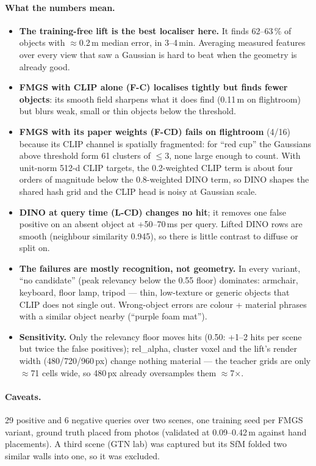 \documentclass[11pt,a4paper]{article}
\begin{document}
\paragraph{What the numbers mean.}
\begin{itemize}
  \item \textbf{The training-free lift is the best localiser here.} It finds 62--63\,\% of objects
        with $\approx$0.2\,m median error, in 3--4\,min. Averaging measured features over every view
        that saw a Gaussian is hard to beat when the geometry is already good.
  \item \textbf{FMGS with CLIP alone (F-C) localises tightly but finds fewer objects}: its smooth
        field sharpens what it does find (0.11\,m on flightroom) but blurs weak, small or thin
        objects below the threshold.
  \item \textbf{FMGS with its paper weights (F-CD) fails on flightroom} (4/16) because its CLIP channel
        is spatially fragmented: for ``red cup'' the Gaussians above threshold form 61 clusters of
        $\leq$3, none large enough to count. With unit-norm 512-d CLIP targets, the 0.2-weighted
        CLIP term is about four orders of magnitude below the 0.8-weighted DINO term, so DINO shapes
        the shared hash grid and the CLIP head is noisy at Gaussian scale.
  \item \textbf{DINO at query time (L-CD) changes no hit}; it removes one false positive on an absent
        object at +50--70\,ms per query. Lifted DINO rows are smooth (neighbour similarity 0.945),
        so there is little contrast to diffuse or split on.
  \item \textbf{The failures are mostly recognition, not geometry.} In every variant, ``no candidate''
        (peak relevancy below the 0.55 floor) dominates: armchair, keyboard, floor lamp, tripod ---
        thin, low-texture or generic objects that CLIP does not single out. Wrong-object errors are
        colour + material phrases with a similar object nearby (``purple foam mat'').
  \item \textbf{Sensitivity.} Only the relevancy floor moves hits (0.50: +1--2 hits per scene but twice
        the false positives); rel\_alpha, cluster voxel and the lift's render width (480/720/960\,px)
        change nothing material --- the teacher grids are only $\approx$71 cells wide, so 480\,px already
        oversamples them $\approx$7$\times$.
\end{itemize}

\paragraph{Caveats.} 29 positive and 6 negative queries over two scenes, one training seed per FMGS
variant, ground truth placed from photos (validated at 0.09--0.42\,m against hand placements).
A third scene (GTN lab) was captured but its SfM folded two similar walls into one, so it was excluded.
\end{document}
